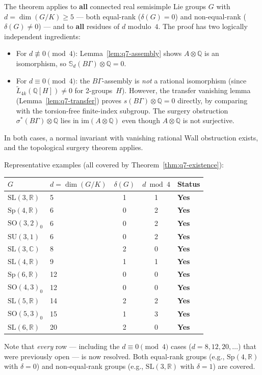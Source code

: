\begin{remark}
The theorem applies to \textbf{all} connected real semisimple Lie groups
$G$ with $d=\dim(G/K)\ge 5$
--- both equal-rank ($\delta(G)=0$) and non-equal-rank ($\delta(G)\ne 0$)
--- and to \textbf{all} residues of $d$ modulo~$4$.
The proof has two logically independent ingredients:
\begin{itemize}
\item For $d\not\equiv 0\pmod{4}$: Lemma~\ref{lem:q7-assembly}
  shows $A\otimes\mathbb Q$ is an isomorphism, so
  $\mathbb S_d(B\Gamma)\otimes\mathbb Q=0$.
\item For $d\equiv 0\pmod{4}$: the $B\Gamma$-assembly is
  \emph{not} a rational isomorphism (since
  $\widetilde L_{4k}(\mathbb Q[H])\ne 0$ for 2-groups~$H$).
  However, the transfer vanishing lemma (Lemma~\ref{lem:q7-transfer})
  proves $s(B\Gamma)\otimes\mathbb Q=0$ directly, by comparing with
  the torsion-free finite-index subgroup.
  The surgery obstruction $\sigma^*(B\Gamma)\otimes\mathbb Q$ lies
  in $\mathrm{im}(A\otimes\mathbb Q)$ even though $A\otimes\mathbb Q$
  is not surjective.
\end{itemize}
In both cases, a normal invariant with vanishing rational Wall
obstruction exists, and the topological surgery theorem applies.

\smallskip\noindent
Representative examples (all covered by Theorem~\ref{thm:q7-existence}):
\smallskip
\begin{center}
\begin{tabular}{llccl}
\toprule
$G$ & $d=\dim(G/K)$ & $\delta(G)$ & $d\bmod 4$ & Status \\
\midrule
$\mathrm{SL}(3,\mathbb R)$ & 5  & 1 & 1 & \textbf{Yes} \\
$\mathrm{Sp}(4,\mathbb R)$ & 6  & 0 & 2 & \textbf{Yes} \\
$\mathrm{SO}(3,2)_0$       & 6  & 0 & 2 & \textbf{Yes} \\
$\mathrm{SU}(3,1)$          & 6  & 0 & 2 & \textbf{Yes} \\
$\mathrm{SL}(3,\mathbb C)$ & 8  & 2 & 0 & \textbf{Yes} \\
$\mathrm{SL}(4,\mathbb R)$ & 9  & 1 & 1 & \textbf{Yes} \\
$\mathrm{Sp}(6,\mathbb R)$ & 12 & 0 & 0 & \textbf{Yes} \\
$\mathrm{SO}(4,3)_0$       & 12 & 0 & 0 & \textbf{Yes} \\
$\mathrm{SL}(5,\mathbb R)$ & 14 & 2 & 2 & \textbf{Yes} \\
$\mathrm{SO}(5,3)_0$       & 15 & 1 & 3 & \textbf{Yes} \\
$\mathrm{SL}(6,\mathbb R)$ & 20 & 2 & 0 & \textbf{Yes} \\
\bottomrule
\end{tabular}
\end{center}
\smallskip\noindent
Note that \emph{every} row --- including the $d\equiv 0\pmod{4}$
cases ($d=8,12,20,\ldots$) that were previously open --- is now resolved.
Both equal-rank groups (e.g., $\mathrm{Sp}(4,\mathbb R)$ with $\delta=0$)
and non-equal-rank groups (e.g., $\mathrm{SL}(3,\mathbb R)$ with $\delta=1$)
are covered.
\end{remark}

